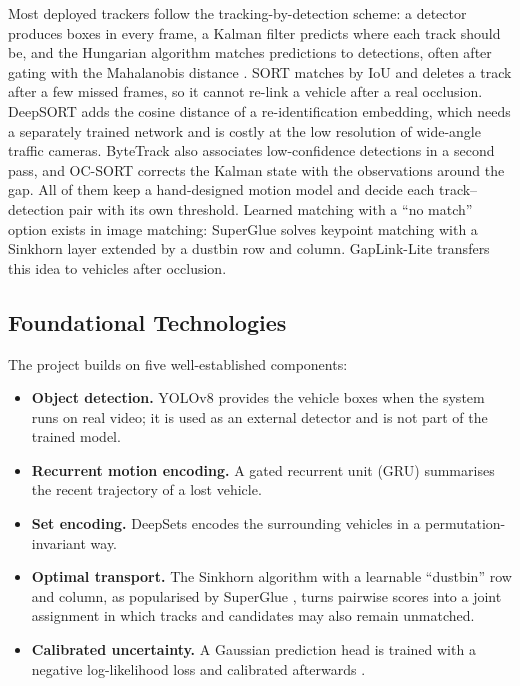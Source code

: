 Most deployed trackers follow the tracking-by-detection scheme: a detector produces boxes in every frame, a Kalman filter \cite{kalman1960} predicts where each track should be, and the Hungarian algorithm \cite{kuhn1955hungarian} matches predictions to detections, often after gating with the Mahalanobis distance \cite{mahalanobis1936}. SORT \cite{bewley2016sort} matches by IoU and deletes a track after a few missed frames, so it cannot re-link a vehicle after a real occlusion. DeepSORT \cite{wojke2017deepsort} adds the cosine distance of a re-identification embedding, which needs a separately trained network and is costly at the low resolution of wide-angle traffic cameras. ByteTrack \cite{zhang2022bytetrack} also associates low-confidence detections in a second pass, and OC-SORT \cite{cao2023ocsort} corrects the Kalman state with the observations around the gap. All of them keep a hand-designed motion model and decide each track--detection pair with its own threshold. Learned matching with a ``no match'' option exists in image matching: SuperGlue \cite{sarlin2020superglue} solves keypoint matching with a Sinkhorn layer extended by a dustbin row and column. GapLink-Lite transfers this idea to vehicles after occlusion.

\subsection{Foundational Technologies}
\label{sec:bg_tech}

The project builds on five well-established components:
\begin{itemize}
    \item \textbf{Object detection.} YOLOv8 \cite{jocher2023yolov8} provides the vehicle boxes when the system runs on real video; it is used as an external detector and is not part of the trained model.
    \item \textbf{Recurrent motion encoding.} A gated recurrent unit (GRU) \cite{cho2014gru} summarises the recent trajectory of a lost vehicle.
    \item \textbf{Set encoding.} DeepSets \cite{zaheer2017deepsets} encodes the surrounding vehicles in a permutation-invariant way.
    \item \textbf{Optimal transport.} The Sinkhorn algorithm \cite{sinkhorn1967,cuturi2013sinkhorn} with a learnable ``dustbin'' row and column, as popularised by SuperGlue \cite{sarlin2020superglue}, turns pairwise scores into a joint assignment in which tracks and candidates may also remain unmatched.
    \item \textbf{Calibrated uncertainty.} A Gaussian prediction head is trained with a negative log-likelihood loss and calibrated afterwards \cite{guo2017calibration}.
\end{itemize}

